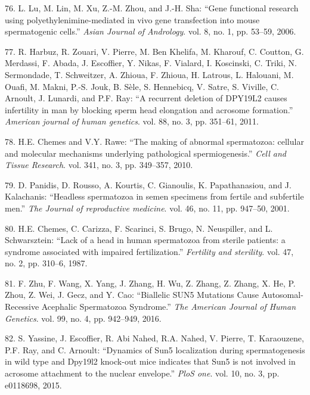 \documentclass[12pt,a4paper,twoside]{ugathesis}
\theoremstyle{definition}
\theoremstyle{definition}
\theoremstyle{definition}
\theoremstyle{remark}
\begin{document}
\hypertarget{ref-Lu2006}{}
76. L. Lu, M. Lin, M. Xu, Z.-M. Zhou, and J.-H. Sha: ``Gene functional
research using polyethylenimine-mediated in vivo gene transfection into
mouse spermatogenic cells.'' \emph{Asian Journal of Andrology}. vol. 8,
no. 1, pp. 53--59, 2006.

\hypertarget{ref-Harbuz2011}{}
77. R. Harbuz, R. Zouari, V. Pierre, M. Ben Khelifa, M. Kharouf, C.
Coutton, G. Merdassi, F. Abada, J. Escoffier, Y. Nikas, F. Vialard, I.
Koscinski, C. Triki, N. Sermondade, T. Schweitzer, A. Zhioua, F. Zhioua,
H. Latrous, L. Halouani, M. Ouafi, M. Makni, P.-S. Jouk, B. Sèle, S.
Hennebicq, V. Satre, S. Viville, C. Arnoult, J. Lunardi, and P.F. Ray:
``A recurrent deletion of DPY19L2 causes infertility in man by blocking
sperm head elongation and acrosome formation.'' \emph{American journal
of human genetics}. vol. 88, no. 3, pp. 351--61, 2011.

\hypertarget{ref-Chemes2010}{}
78. H.E. Chemes and V.Y. Rawe: ``The making of abnormal spermatozoa:
cellular and molecular mechanisms underlying pathological
spermiogenesis.'' \emph{Cell and Tissue Research}. vol. 341, no. 3, pp.
349--357, 2010.

\hypertarget{ref-Panidis2001}{}
79. D. Panidis, D. Rousso, A. Kourtis, C. Gianoulis, K. Papathanasiou,
and J. Kalachanis: ``Headless spermatozoa in semen specimens from
fertile and subfertile men.'' \emph{The Journal of reproductive
medicine}. vol. 46, no. 11, pp. 947--50, 2001.

\hypertarget{ref-Chemes1987}{}
80. H.E. Chemes, C. Carizza, F. Scarinci, S. Brugo, N. Neuspiller, and
L. Schwarsztein: ``Lack of a head in human spermatozoa from sterile
patients: a syndrome associated with impaired fertilization.''
\emph{Fertility and sterility}. vol. 47, no. 2, pp. 310--6, 1987.

\hypertarget{ref-Zhu2016}{}
81. F. Zhu, F. Wang, X. Yang, J. Zhang, H. Wu, Z. Zhang, Z. Zhang, X.
He, P. Zhou, Z. Wei, J. Gecz, and Y. Cao: ``Biallelic SUN5 Mutations
Cause Autosomal-Recessive Acephalic Spermatozoa Syndrome.'' \emph{The
American Journal of Human Genetics}. vol. 99, no. 4, pp. 942--949, 2016.

\hypertarget{ref-Yassine2015}{}
82. S. Yassine, J. Escoffier, R. Abi Nahed, R.A. Nahed, V. Pierre, T.
Karaouzene, P.F. Ray, and C. Arnoult: ``Dynamics of Sun5 localization
during spermatogenesis in wild type and Dpy19l2 knock-out mice indicates
that Sun5 is not involved in acrosome attachment to the nuclear
envelope.'' \emph{PloS one}. vol. 10, no. 3, pp. e0118698, 2015.
\end{document}

